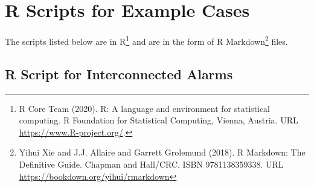 %
%

\chapter{R Scripts for Example Cases}
\label{rscripts}

The scripts listed below are in R\footnote{R Core Team (2020). R: A language and environment for statistical computing. R Foundation for Statistical Computing, Vienna, Austria. URL \url{https://www.R-project.org/}.} and are in the form of R Markdown\footnote{Yihui Xie and J.J. Allaire and Garrett Grolemund (2018). R Markdown: The Definitive Guide. Chapman and Hall/CRC. ISBN 9781138359338. URL \url{https://bookdown.org/yihui/rmarkdown}} files.

\section{R Script for Interconnected Alarms}
\label{rscript-interconnect}
\vspace{\baselineskip}
